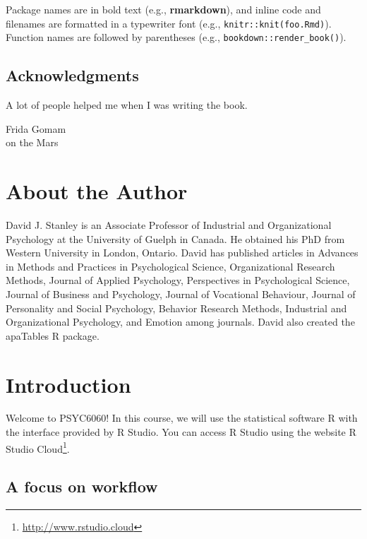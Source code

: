 \documentclass[
]{krantz}
\renewcommand{\href}[2]{#2\footnote{\url{#1}}}
\begin{document}
Package names are in bold text (e.g., \textbf{rmarkdown}), and inline code and filenames are formatted in a typewriter font (e.g., \texttt{knitr::knit(\textquotesingle{}foo.Rmd\textquotesingle{})}). Function names are followed by parentheses (e.g., \texttt{bookdown::render\_book()}).

\hypertarget{acknowledgments}{%
\section*{Acknowledgments}\label{acknowledgments}}


A lot of people helped me when I was writing the book.

\begin{flushright}
Frida Gomam\\
on the Mars
\end{flushright}

\hypertarget{about-the-author}{%
\chapter*{About the Author}\label{about-the-author}}


David J. Stanley is an Associate Professor of Industrial and Organizational Psychology at the University of Guelph in Canada. He obtained his PhD from Western University in London, Ontario. David has published articles in Advances in Methods and Practices in Psychological Science, Organizational Research Methods, Journal of Applied Psychology, Perspectives in Psychological Science, Journal of Business and Psychology, Journal of Vocational Behaviour, Journal of Personality and Social Psychology, Behavior Research Methods, Industrial and Organizational Psychology, and Emotion among journals. David also created the apaTables R package.

\mainmatter

\hypertarget{introduction}{%
\chapter{Introduction}\label{introduction}}

Welcome to PSYC6060! In this course, we will use the statistical software R with the interface provided by R Studio. You can access R Studio using the website \href{http://www.rstudio.cloud}{R Studio Cloud}.

\hypertarget{a-focus-on-workflow}{%
\section{A focus on workflow}\label{a-focus-on-workflow}}
\end{document}

